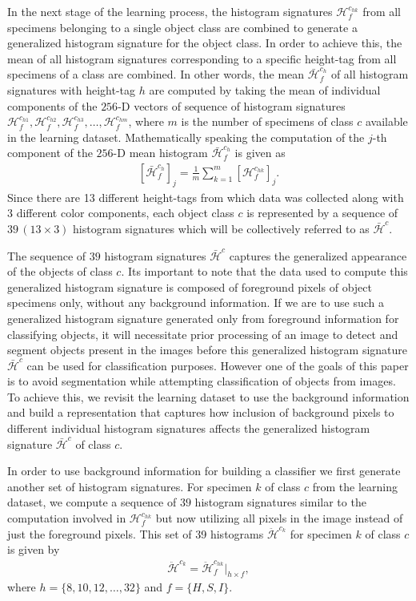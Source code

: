 \documentclass {udthesis}
\begin{document}
In the next stage of the learning process, the histogram signatures $\mathcal{H}^{c_{hk}}_f$ from all specimens belonging to a single object class are combined to generate a generalized histogram signature for the object class.
In order to achieve this, the mean of all histogram signatures corresponding to a specific height-tag from all specimens of a class are combined. In other words, the mean $\bar{\mathcal{H}}^{c_{h}}_f$ of all histogram signatures with  height-tag $h$ are computed by taking the mean of individual components of the $256$-D vectors of sequence of histogram signatures $\mathcal{H}^{c_{h1}}_f, \mathcal{H}^{c_{h2}}_f, \mathcal{H}^{c_{h3}}_f, \ldots, \mathcal{H}^{c_{hm}}_f$, where $m$ is the number of specimens of class $c$ available in the learning dataset. Mathematically speaking the computation of the $j$-th component of the $256$-D mean histogram $\bar{\mathcal{H}}^{c_{h}}_f$ is given as
\begin{align}
 \left[\bar{\mathcal{H}}^{c_{h}}_f\right]_j=\frac{1}{m}\sum_{k=1}^{m} \left[ \mathcal{H}^{c_{hk}}_f \right]_j.
\end{align}
Since there are 13 different height-tags from which data was collected along with 3 different color components, each object class $c$ is represented by a sequence of $39\, (13 \times 3)$ histogram signatures which will be collectively referred to as $\bar{\mathcal{H}}^{c}$.

The sequence of $39$ histogram signatures $\bar{\mathcal{H}}^{c}$ captures the generalized appearance of the objects of class $c$. Its important to note that the data used to compute this generalized histogram signature is composed of foreground pixels of object specimens only, without any background information. If we are to use such a generalized histogram signature generated only from foreground information for classifying objects, it will necessitate prior processing of an image to detect and segment objects present in the images before this generalized histogram signature $\bar{\mathcal{H}}^{c}$ can be used for classification purposes. However one of the goals of this paper is to avoid segmentation while attempting classification of objects from images. To achieve this, we revisit the learning dataset to use the background information and build a representation that captures how inclusion of background pixels to different individual histogram signatures affects the generalized histogram signature $\bar{
\mathcal{H}}^{c}$ of class $c$. 

In order to use background information for building a classifier we first generate another set of histogram signatures.
For specimen $k$ of class $c$ from the learning dataset, we compute a sequence of $39$ histogram signatures similar to the computation involved in $\mathcal{H}^{c_{hk}}_f$ but now utilizing all pixels in the image instead of just the foreground pixels. This set of 39 histograms $\ddot{\mathcal{H}}^{c_{k}}$ for specimen $k$ of class $c$ is given by
\begin{align}	\label{eqn:hist_signature}
 \ddot{\mathcal{H}}^{c_{k}} = \ddot{\mathcal{H}}^{c_{hk}}_f \Big|_{h\times f},
\end{align}
%
where $h=\{8,10,12, \ldots,32\}$ and $f=\{H,S,I\}$.
\end{document}
